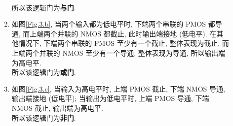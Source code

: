 \documentclass[UTF8,fontset=fandol]{ctexart}
\begin{document}
\begin{description}
\begin{enumerate}
        \\所以该逻辑门为\textbf{与门}.
        \item 如图\ref{Fig.3.b}, 当两个输入都为低电平时, 下端两个串联的 PMOS 都导通, 而上端两个并联的 NMOS 都截止, 此时输出端接地 (低电平). 在其他情况下, 下端两个串联的 PMOS 至少有一个截止, 整体表现为截止, 而上端两个并联的 NMOS 至少有一个导通, 整体表现为导通, 所以输出端为高电平.
        \\所以该逻辑门为\textbf{或门}.
        \item 如图\ref{Fig.3.c}, 当输入为高电平时, 上端 PMOS 截止, 下端 NMOS 导通, 输出端接地 (低电平); 当输出为低电平时, 上端 PMOS 导通, 下端 NMOS 截止, 输出端为高电平.
        \\所以该逻辑门为\textbf{非门}.
    \end{enumerate} 
    \begin{figure}[H]
        \centering
\end{figure}
\end{description}
\end{document}
